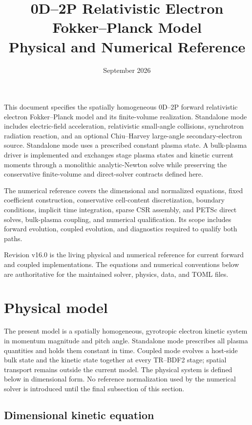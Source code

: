 \documentclass[11pt]{article}
\title{0D--2P Relativistic Electron Fokker--Planck Model\\Physical and Numerical Reference}
\author{}
\date{September 2026}
\begin{document}
\maketitle

\noindent
This document specifies the spatially homogeneous 0D--2P forward relativistic
electron Fokker--Planck model and its finite-volume realization.  Standalone mode
includes electric-field acceleration, relativistic small-angle collisions,
synchrotron radiation reaction, and an optional Chiu--Harvey large-angle
secondary-electron source.  Standalone mode uses a prescribed constant plasma
state.  A bulk-plasma driver is implemented and exchanges stage plasma states and
kinetic current moments through a monolithic analytic-Newton solve while preserving
the conservative finite-volume and direct-solver contracts defined here.

The numerical reference covers the dimensional and normalized equations, fixed
coefficient construction, conservative cell-content discretization, boundary
conditions, implicit time integration, sparse CSR assembly, and PETSc direct solves,
bulk-plasma coupling, and numerical qualification.  Its scope includes forward
evolution, coupled evolution, and diagnostics required to qualify both paths.

Revision v16.0 is the living physical and numerical reference for current forward
and coupled implementations.  The equations and numerical conventions below are
authoritative for the maintained solver, physics, data, and TOML files.

\section{Physical model}

The present model is a spatially homogeneous, gyrotropic electron kinetic system in
momentum magnitude and pitch angle.  Standalone mode prescribes all plasma quantities
and holds them constant in time.  Coupled mode evolves a host-side bulk state and the
kinetic state together at every TR--BDF2 stage; spatial transport remains outside the
current model.  The physical system is defined below in dimensional form.  No reference
normalization used by the numerical solver is introduced until the final subsection of
this section.

\subsection{Dimensional kinetic equation}
\end{document}
